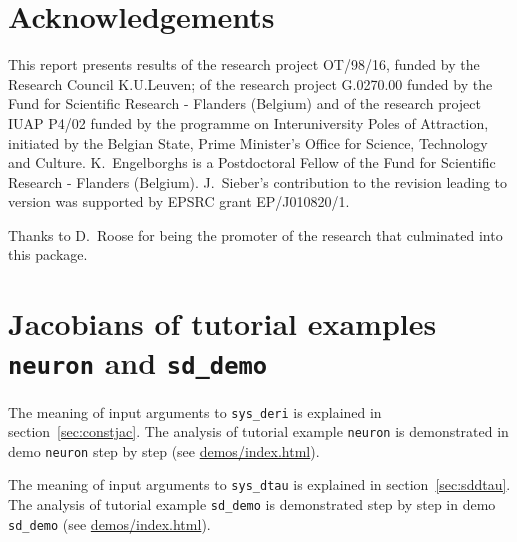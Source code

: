 \documentclass[10pt]{scrartcl}
\newcommand{\demobase}{\url{demos/index.html}}
\newcommand{\blist}[1]{\mbox{\lstinline!#1!}}
\begin{document}
{\section*{Acknowledgements}

This report presents results of the research project OT/98/16, funded
by the Research Council K.U.Leuven; of the research project G.0270.00
funded by the Fund for Scientific Research - Flanders (Belgium) and of
the research project IUAP P4/02 funded by the programme on
Interuniversity Poles of Attraction, initiated by the Belgian State,
Prime Minister's Office for Science, Technology and Culture.
K.~Engelborghs is a Postdoctoral Fellow of the Fund for Scientific
Research - Flanders (Belgium).  J.~Sieber's contribution to the
revision leading to version \version{} was supported by EPSRC grant
EP/J010820/1.

Thanks to D.~Roose for being the promoter of
the research that culminated into this package.





\newpage
\appendix

\section{Jacobians of tutorial examples \blist{neuron} and \blist{sd_demo}}
\label{sec:sys:deri}
The meaning of input arguments to \blist{sys_deri} is explained in
section~\ref{sec:constjac}. The analysis of tutorial example
\blist{neuron} is demonstrated in demo \texttt{neuron} step by step
(see \demobase{}).



The meaning of input arguments to \blist{sys_dtau} is explained in
section~\ref{sec:sddtau}. The analysis of tutorial example
\blist{sd_demo} is demonstrated step by step in demo \texttt{sd\_demo}
(see \demobase{}).
 \newpage

}
\end{document}
